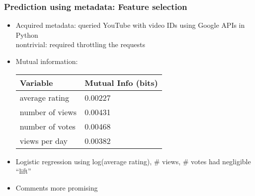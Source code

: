 \documentclass[fleqn]{beamer}
\begin{document}
\begin{frame}
\frametitle{Prediction using metadata: Feature selection}
      \begin{itemize}
      	\item Acquired metadata: queried YouTube with video IDs using Google APIs in Python\\
	         nontrivial: required throttling the requests
          \item Mutual information: \\
          		\begin{center}
        			\begin{tabular}{ | l | l |}
			\hline
			Variable & Mutual Info (bits) \\ \hline
			average rating & 0.00227\\ \hline
			number of views & 0.00431\\ \hline
			number of votes & 0.00468\\ \hline
			views per day & 0.00382 \\
			\hline
			\end{tabular}
					
      		\end{center}	
          \item Logistic regression using log(average rating), \# views, \# votes
                   had negligible ``lift''
          \item Comments more promising
      \end{itemize}

\end{frame}
\end{document}
